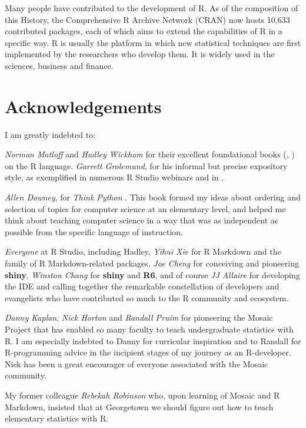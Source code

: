 \documentclass[]{book}
\theoremstyle{definition}
\theoremstyle{definition}
\theoremstyle{remark}
\begin{document}
Many people have contributed to the development of R. As of the
composition of this History, the Comprehensive R Archive Network (CRAN)
now hosts 10,633 contributed packages, each of which aims to extend the
capabilities of R in a specific way. R is usually the platform in which
new statistical techniques are first implemented by the researchers who
develop them. It is widely used in the sciences, business and finance.

\section{Acknowledgements}\label{acknowledgements}

I am greatly indebted to:

\emph{Norman Matloff} and \emph{Hadley Wickham} for their excellent
foundational books (\citep{Matloff2011}, \citep{Wickham2014}) on the R
language. \emph{Garrett Grolemund}, for his informal but precise
expository style, as exemplified in numerous R Studio webinars and in
\citep{Grolemund2014}.

\emph{Allen Downey}, for \emph{Think Python} \citep{Downey2015}. This
book formed my ideas about ordering and selection of topics for computer
science at an elementary level, and helped me think about teaching
computer science in a way that was as independent as possible from the
specific language of instruction.

\emph{Everyone} at R Studio, including Hadley, \emph{Yihui Xie} for R
Markdown and the family of R Markdown-related packages, \emph{Joe Cheng}
for conceiving and pioneering \textbf{shiny}, \emph{Winston Chang} for
\textbf{shiny} and \textbf{R6}, and of course \emph{JJ Allaire} for
developing the IDE and calling together the remarkable constellation of
developers and evangelists who have contributed so much to the R
community and ecosystem.

\emph{Danny Kaplan}, \emph{Nick Horton} and \emph{Randall Pruim} for
pioneering the Mosaic Project that has enabled so many faculty to teach
undergraduate statistics with R. I am especially indebted to Danny for
curricular inspiration and to Randall for R-programming advice in the
incipient stages of my journey as an R-developer. Nick has been a great
encourager of everyone associated with the Mosaic community.

My former colleague \emph{Rebekah Robinson} who, upon learning of Mosaic
and R Markdown, insisted that at Georgetown we should figure out how to
teach elementary statistics with R.
\end{document}
